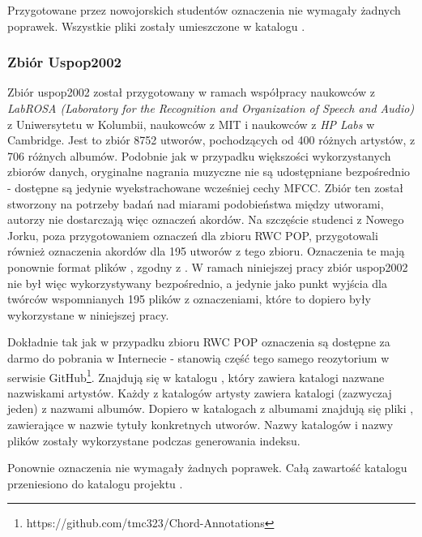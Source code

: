 Przygotowane przez nowojorskich studentów oznaczenia nie wymagały żadnych poprawek. Wszystkie pliki
 zostały umieszczone w katalogu .

\subsubsection{Zbiór Uspop2002}

Zbiór uspop2002 \cite{berenzweig_large-scale_2004} został przygotowany w ramach współpracy naukowców
z \emph{LabROSA (Laboratory for the Recognition and Organization of Speech and Audio)} z
Uniwersytetu w Kolumbii, naukowców z MIT i naukowców z \emph{HP Labs} w Cambridge. Jest to zbiór
8752 utworów, pochodzących od 400 różnych artystów, z 706 różnych albumów. Podobnie jak w przypadku
większości wykorzystanych zbiorów danych, oryginalne nagrania muzyczne nie są udostępniane
bezpośrednio - dostępne są jedynie wyekstrachowane wcześniej cechy MFCC. Zbiór ten został stworzony
na potrzeby badań nad miarami podobieństwa między utworami, autorzy nie dostarczają więc oznaczeń
akordów. Na szczęście studenci z Nowego Jorku, poza przygotowaniem oznaczeń dla zbioru RWC POP,
przygotowali również oznaczenia akordów dla 195 utworów z tego zbioru. Oznaczenia te mają ponownie
format plików , zgodny z \cite{harte_towards_nodate}. W ramach niniejszej pracy zbiór
uspop2002 nie był więc wykorzystywany bezpośrednio, a jedynie jako punkt wyjścia dla twórców
wspomnianych 195 plików z oznaczeniami, które to dopiero były wykorzystane w niniejszej pracy.

Dokładnie tak jak w przypadku zbioru RWC POP oznaczenia są dostępne za darmo do pobrania w
Internecie - stanowią część tego samego reozytorium w serwisie
GitHub\footnote{https://github.com/tmc323/Chord-Annotations}. Znajdują się w katalogu
, który zawiera katalogi nazwane nazwiskami artystów. Każdy z katalogów artysty
zawiera katalogi (zazwyczaj jeden) z nazwami albumów. Dopiero w katalogach z albumami znajdują się
pliki , zawierające w nazwie tytuły konkretnych utworów. Nazwy katalogów i nazwy plików
zostały wykorzystane podczas generowania indeksu.

Ponownie oznaczenia nie wymagały żadnych poprawek. Całą zawartość katalogu 
przeniesiono do katalogu projektu .

